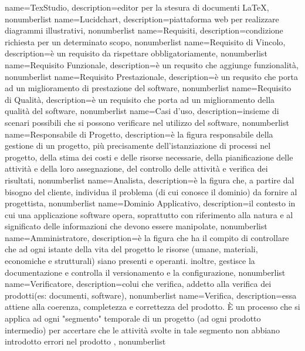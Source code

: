 {
name={TexStudio},
description={editor per la stesura di documenti \LaTeX},
nonumberlist 
}
{
name={Lucidchart},
description={piattaforma web per realizzare diagrammi illustrativi},
nonumberlist 
}
{
name={Requisiti},
description={condizione richiesta per un determinato scopo},
nonumberlist 
}
{
name={Requisito di Vincolo},
description={è un requisito da rispettare obbligatoriamente},
nonumberlist 
}
{
name={Requisito Funzionale},
description={è un requsito che aggiunge funzionalità},
nonumberlist 
}
{
name={Requisito Prestazionale},
description={è un requsito che porta ad un miglioramento di prestazione del software},
nonumberlist 
}
{
	name={Requisito di Qualità},
	description={è un requisito che porta ad un miglioramento della qualità del software},
	nonumberlist 
}
{
name={Casi d'uso},
description={insieme di scenari possibili che si possono verificare nel	utilizzo del software},
nonumberlist 
}
{
name={Responsabile di Progetto},
description={è la figura responsabile della gestione di un progetto, più precisamente dell'istanziazione di processi nel progetto, della stima dei costi e delle risorse necessarie, della pianificazione delle attività e della loro assegnazione, del controllo delle attività e verifica dei risultati},
nonumberlist 
}
{
name={Analista},
description={è la figura che, a partire dal bisogno del cliente, individua il problema (di cui conosce il dominio) da fornire al progettista},
nonumberlist 
}
{
name={Dominio Applicativo},
description={il contesto in cui una applicazione software opera, soprattutto con riferimento alla natura e al significato delle informazioni che devono essere manipolate},
nonumberlist 
}
{
name={Amministratore},
description={è la figura che ha il compito di controllare che ad ogni istante della vita del progetto le risorse (umane, materiali, economiche e strutturali) siano presenti e operanti. inoltre, gestisce la documentazione e controlla il versionamento e la configurazione},
nonumberlist 
}
{
name={Verificatore},
description={colui che verifica, addetto alla verifica dei prodotti(es: documenti, software)},
nonumberlist 
}
{
name={Verifica},
description={essa attiene alla coerenza, completezza e correttezza del prodotto. È un processo che si applica ad ogni "segmento" temporale di un progetto (ad ogni prodotto intermedio) per accertare che le attività svolte in tale segmento non abbiano introdotto errori nel prodotto
},
nonumberlist 
}
